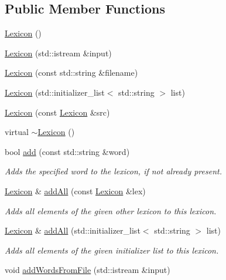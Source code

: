 \subsection*{Public Member Functions}
\begin{DoxyCompactItemize}
\item 
\mbox{\hyperlink{classLexicon_ac38cafae91a89528e71f257cbad724fd}{Lexicon}} ()
\item 
\mbox{\hyperlink{classLexicon_a6e60e4bcfef0337c5133d3bedcccd06f}{Lexicon}} (std\+::istream \&input)
\item 
\mbox{\hyperlink{classLexicon_a64a064a38897e1e4ce9b755a238723f4}{Lexicon}} (const std\+::string \&filename)
\item 
\mbox{\hyperlink{classLexicon_a0acc6dfba69bc35cba25ee02ac91c4e5}{Lexicon}} (std\+::initializer\+\_\+list$<$ std\+::string $>$ list)
\item 
\mbox{\hyperlink{classLexicon_acd310b995d41180f2f29bd68bec7d290}{Lexicon}} (const \mbox{\hyperlink{classLexicon}{Lexicon}} \&src)
\item 
virtual \mbox{\hyperlink{classLexicon_a9d71fdc56ec42614e240463e6724969e}{$\sim$\+Lexicon}} ()
\item 
bool \mbox{\hyperlink{classLexicon_ae678e727fb107637268e8f00cd759889}{add}} (const std\+::string \&word)
\begin{DoxyCompactList}\small\item\em Adds the specified word to the lexicon, if not already present. \end{DoxyCompactList}\item 
\mbox{\hyperlink{classLexicon}{Lexicon}} \& \mbox{\hyperlink{classLexicon_a9d62d8dcb351ae40c8a2220a9871348b}{add\+All}} (const \mbox{\hyperlink{classLexicon}{Lexicon}} \&lex)
\begin{DoxyCompactList}\small\item\em Adds all elements of the given other lexicon to this lexicon. \end{DoxyCompactList}\item 
\mbox{\hyperlink{classLexicon}{Lexicon}} \& \mbox{\hyperlink{classLexicon_a554e59039648403990042d16710855e0}{add\+All}} (std\+::initializer\+\_\+list$<$ std\+::string $>$ list)
\begin{DoxyCompactList}\small\item\em Adds all elements of the given initializer list to this lexicon. \end{DoxyCompactList}\item 
void \mbox{\hyperlink{classLexicon_a215fcead487aace2e89b04863e326ba6}{add\+Words\+From\+File}} (std\+::istream \&input)

\end{DoxyCompactItemize}
